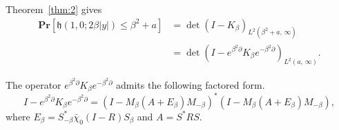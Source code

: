 \documentclass[AHL,Unicode,longabstracts]{cedram}
\newcommand{\pr}[1]{\mathbf{Pr}\left[#1\right]}
\newcommand{\h}{\mathfrak{h}}
\begin{document}
Theorem~\ref{thm:2} gives
\begin{align}\label{eqn:h10a}
\pr{\h(1,0; 2\beta |y|) \leq \beta^2 + a} &= \det \left (I - K_{\beta} \right)_{L^2(\beta^2 + a,\,\infty)} \\
\nonumber &= \det \left (I - e^{\beta^2 \partial} K_{\beta} e^{-\beta^2 \partial} \right)_{L^2(a,\,\infty)}.
\end{align}

\begin{lemm} \label{lem:factor}
The operator $e^{\beta^2 \partial} K_{\beta} e^{-\beta^2 \partial}$ admits the following factored form.
\[
I - e^{\beta^2 \partial} K_{\beta} e^{-\beta^2 \partial} =
\left (I - M_{\beta}(A+ E_{\beta})M_{-\beta} \right)^{*} \left(I - M_{\beta}(A+ E_{\beta})M_{-\beta} \right),
\]
where $E_{\beta} = S_{-\beta}^{*} \bar{\chi}_0 (I-R) S_{\beta}$ and $A = S^{*} R S$.
\end{lemm}
\end{document}
